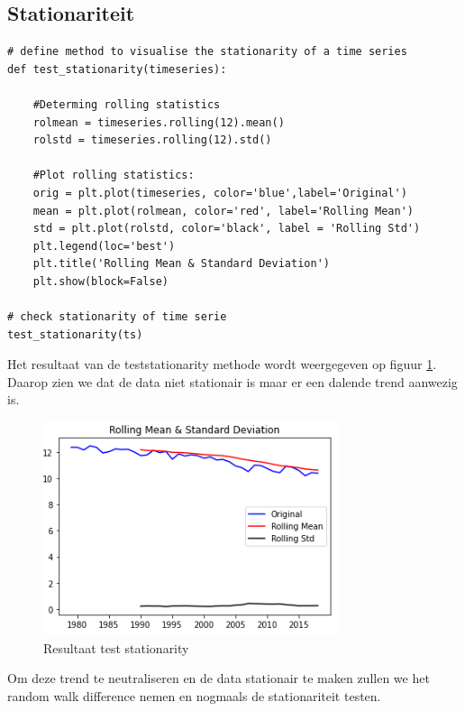 \subsection{Stationariteit}
\begin{verbatim}
# define method to visualise the stationarity of a time series
def test_stationarity(timeseries):

    #Determing rolling statistics
    rolmean = timeseries.rolling(12).mean()
    rolstd = timeseries.rolling(12).std()
    
    #Plot rolling statistics:
    orig = plt.plot(timeseries, color='blue',label='Original')
    mean = plt.plot(rolmean, color='red', label='Rolling Mean')
    std = plt.plot(rolstd, color='black', label = 'Rolling Std')
    plt.legend(loc='best')
    plt.title('Rolling Mean & Standard Deviation')
    plt.show(block=False)

# check stationarity of time serie
test_stationarity(ts)
\end{verbatim}

Het resultaat van de test\textunderscore stationarity methode wordt weergegeven op figuur \ref{fig:stationarityunivariatenonseasonal}. Daarop zien we dat de data niet stationair is maar er een dalende trend aanwezig is.

\begin{figure}
    \centering
    \caption{Resultaat test stationarity}
    \label{fig:stationarityunivariatenonseasonal}
    \includegraphics[width=0.7\linewidth]{stationarity_univariate_non_seasonal}
\end{figure}

Om deze trend te neutraliseren en de data stationair te maken zullen we het random walk difference nemen en nogmaals de stationariteit testen.

